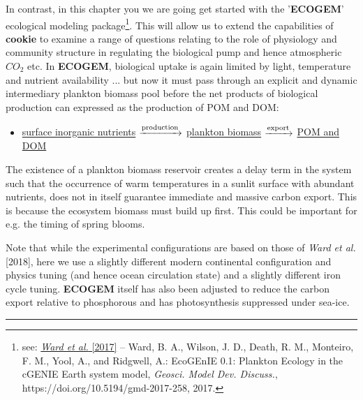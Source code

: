 In contrast, in this chapter you we are going get started with the '\textbf{ECOGEM}' ecological modeling package\footnote{see: \href{https://doi.org/10.5194/gmd-2017-258}{\textit{Ward et al.} [2017]} -- Ward, B. A., Wilson, J. D., Death, R. M., Monteiro, F. M., Yool, A., and Ridgwell, A.: EcoGEnIE 0.1: Plankton Ecology in the cGENIE Earth system model, \textit{Geosci. Model Dev. Discuss.}, https://doi.org/10.5194/gmd-2017-258, 2017.}. This will allow us to extend the capabilities of \textbf{cookie} to examine a range of questions relating to the role of physiology and community structure in regulating the biological pump and hence atmospheric \(CO_{2}\) etc. In \textbf{ECOGEM}, biological uptake is again limited by light, temperature and nutrient availability ... but now it must pass through an explicit and dynamic intermediary plankton biomass pool before the net products of biological production can expressed as the production of POM and DOM:
\vspace{4mm}
\begin{itemize}
\item \underline{surface inorganic nutrients} $\xrightarrow[]{\rm production}$ \underline{plankton biomass} $\xrightarrow[]{\rm export}$ \underline{POM and DOM}
\end{itemize}
\vspace{2mm}

\vspace{1mm}
The existence of a plankton biomass reservoir creates a delay term in the system such that the occurrence of warm temperatures in a sunlit surface with abundant nutrients, does not in itself guarantee immediate and massive carbon export. This is because the ecosystem biomass must build up first. This could be important for e.g. the timing of spring blooms.

\vspace{1mm}
Note that while the experimental configurations are based on those of \textit{Ward et al.} [2018], here we use a slightly different modern continental configuration and physics tuning (and hence ocean circulation state) and a slightly different iron cycle tuning. \textbf{ECOGEM} itself has also been adjusted to reduce the carbon export relative to phosphorous and has photosynthesis suppressed under sea-ice.

\vspace{1mm}\noindent\rule{4cm}{0.5pt}\vspace{2mm}

